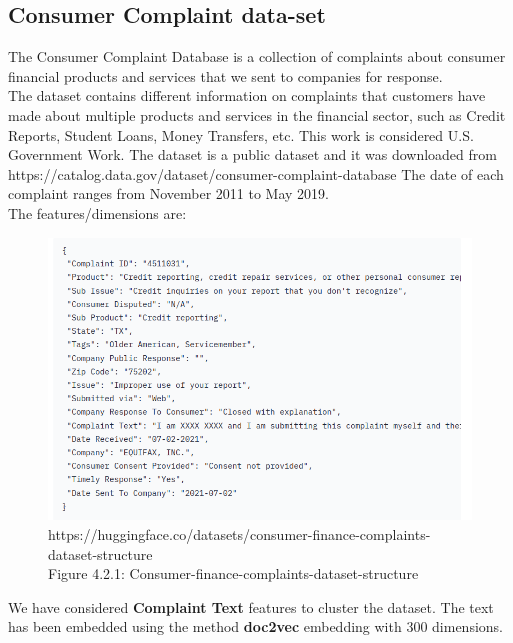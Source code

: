 \documentclass[11pt]{article}
\theoremstyle{definition}
\begin{document}
\subsection{Consumer Complaint data-set}
The Consumer Complaint Database is a collection of complaints about consumer financial products and services that we sent to companies for response. \\
The dataset contains different information on complaints that customers have made about multiple products and services in the financial sector, such as Credit Reports, Student Loans, Money Transfers, etc. This work is considered U.S. Government Work. The dataset is a public dataset and it was downloaded from https://catalog.data.gov/dataset/consumer-complaint-database
The date of each complaint ranges from November 2011 to May 2019.\\
The features/dimensions are:
\begin{figure}[H]
\centering
\includegraphics[scale=.55]{images/comlaint.png}\\
https://huggingface.co/datasets/consumer-finance-complaints-dataset-structure\\
Figure 4.2.1: Consumer-finance-complaints-dataset-structure
\end{figure}
\noindent We have considered \textbf{Complaint Text} features to cluster the dataset.
The text has been embedded using the method \textbf{doc2vec} embedding with 300 dimensions. 
\end{document}
